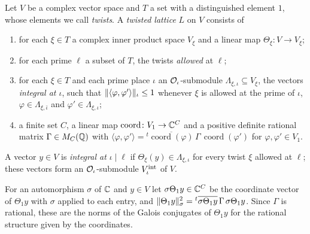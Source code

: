 \begin{definition}\label{def:twisted-lattice}
Let $V$ be a complex vector space and $T$ a set with a distinguished element $1$, whose elements we
call \emph{twists}. A \emph{twisted lattice} $L$ on $V$ consists of
\begin{enumerate}[label=\textup{(\roman*)}]
\item for each $\xi\in T$ a complex inner product space $V_\xi$ and a linear map $\Theta_\xi\colon
V\to V_\xi$;
\item for each prime $\ell$ a subset of $T$, the twists \emph{allowed} at $\ell$;
\item for each $\xi\in T$ and each prime place $\iota$ an $\mathcal{O}_\iota$-submodule
$\Lambda_{\xi,\iota}\subseteq V_\xi$, the vectors \emph{integral at $\iota$}, such that
$\lVert \langle\varphi,\varphi'\rangle\rVert_\iota\le1$ whenever $\xi$ is allowed at the prime of $\iota$,
$\varphi\in\Lambda_{\xi,\bar\iota}$ and $\varphi'\in\Lambda_{\xi,\iota}$;
\item a finite set $C$, a linear map $\operatorname{coord}\colon V_1\to\mathbb{C}^C$ and a positive definite
rational matrix $\Gamma\in M_C(\mathbb{Q})$ with $\langle\varphi,\varphi'\rangle
={}^t\overline{\operatorname{coord}(\varphi)}\,\Gamma\,\operatorname{coord}(\varphi')$ for
$\varphi,\varphi'\in V_1$.
\end{enumerate}
A vector $y\in V$ is \emph{integral at $\iota\mid\ell$} if $\Theta_\xi(y)\in\Lambda_{\xi,\iota}$ for
every twist $\xi$ allowed at $\ell$; these vectors form an $\mathcal{O}_\iota$-submodule $V_\iota^{\rm int}$
of $V$.
\end{definition}

For an automorphism $\sigma$ of $\mathbb{C}$ and $y\in V$ let $\sigma\Theta_1y\in\mathbb{C}^C$ be the coordinate
vector of $\Theta_1y$ with $\sigma$ applied to each entry, and
$\lVert \Theta_1y\rVert_\sigma^2={}^t\overline{\sigma\Theta_1y}\,\Gamma\,\sigma\Theta_1y$. Since $\Gamma$ is
rational, these are the norms of the Galois conjugates of $\Theta_1y$ for the rational structure given
by the coordinates.

